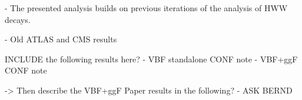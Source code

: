 
- The presented analysis builds on previous iterations of the analysis of HWW decays.

- Old ATLAS and CMS results

INCLUDE the following results here?
- VBF standalone CONF note
- VBF+ggF CONF note

-> Then describe the VBF+ggF Paper results in the following?
- ASK BERND

